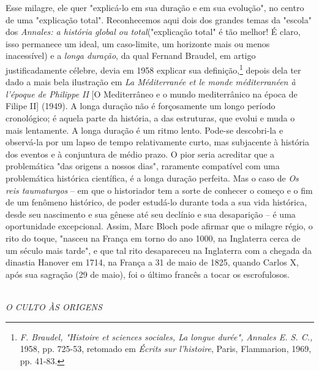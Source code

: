 \documentclass[a5paper]{book}
\begin{document}
Esse milagre, ele quer "explicá-lo em sua duração e em sua evolução", no centro de uma "explicação total". Reconhecemos aqui dois dos grandes temas da "escola" dos \textit{Annales: a história global ou total}("explicação total" é tão melhor! É claro, isso permanece um ideal, um caso-limite, um horizonte mais ou menos inacessível) e a \textit{longa duração}, da qual Fernand Braudel, em artigo justificadamente célebre, devia em 1958 explicar sua definição,\footnote{\textit{F. Braudel, "Histoire et sciences sociales, La longue durée", Annales E. S. C.,} 1958, pp. 725-53, retomado em \textit{Écrits sur l'histoire}, Paris, Flammarion, 1969, pp. 41-83.} depois dela ter dado a mais bela ilustração em \textit{La Méditerranée et le monde méditerranéen à l'époque de Philippe II} [O Mediterrâneo e o mundo mediterrânico na época de Filipe II] (1949). A longa duração não é forçosamente um longo período cronológico; é aquela parte da história, a das estruturas, que evolui e muda o mais lentamente. A longa duração é um ritmo lento. Pode-se descobri-la e observá-la por um lapso de tempo relativamente curto, mas subjacente à história dos eventos e à conjuntura de médio prazo. O pior seria acreditar que a problemática "das origens a nossos dias", raramente compatível com uma problemática histórica científica, é a longa duração perfeita. Mas o caso de \textit{Os reis taumaturgos} -- em que o historiador tem a sorte de conhecer o começo e o fim de um fenômeno histórico, de poder estudá-lo durante toda a sua vida histórica, desde seu nascimento e sua gênese até seu declínio e sua desaparição -- é uma oportunidade excepcional. Assim, Marc Bloch pode afirmar que o milagre régio, o rito do toque, "nasceu na França em torno do ano 1000, na Inglaterra cerca de um século mais tarde", e que tal rito desapareceu na Inglaterra com a chegada da dinastia Hanover em 1714, na França a 31 de maio de 1825, quando Carlos X, após sua sagração (29 de maio), foi o último francês a tocar os escrofulosos.

~\\ \large \textit{O CULTO ÀS ORIGENS} ~\\
\end{document}
